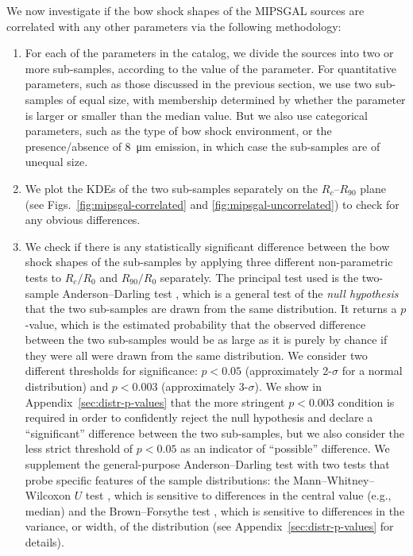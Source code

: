 We now investigate if the bow shock shapes of the MIPSGAL sources are
correlated with any other parameters via the following methodology:
\begin{enumerate}[1.]
\item For each of the parameters in the \citet{Kobulnicky:2016a}
  catalog, we divide the sources into two or more sub-samples,
  according to the value of the parameter.  For quantitative
  parameters, such as those discussed in the previous section, we use
  two sub-samples of equal size, with membership determined by whether
  the parameter is larger or smaller than the median value.  But we
  also use categorical parameters, such as the type of bow shock
  environment, or the presence/absence of \SI{8}{\um} emission, in
  which case the sub-samples are of unequal size.
\item We plot the KDEs of the two sub-samples separately on the
  \(R_c\)--\(R_{90}\) plane (see Figs.~\ref{fig:mipsgal-correlated} and
  \ref{fig:mipsgal-uncorrelated}) to check for any obvious
  differences.
\item We check if there is any statistically significant difference
  between the bow shock shapes of the sub-samples by applying three
  different non-parametric tests to \(R_c/R_0\) and \(R_{90}/R_0\)
  separately.  The principal test used is the two-sample
  Anderson--Darling test \citep{Anderson:1952a, Scholz:1987a,
    Makarov:2017a}, which is a general test of the \textit{null
    hypothesis} that the two sub-samples are drawn from the same
  distribution.  It returns a \(p\)-value, which is the estimated
  probability that the observed difference between the two sub-samples
  would be as large as it is purely by chance if they were all were
  drawn from the same distribution.  We consider two different
  thresholds for significance: \(p < 0.05\) (approximately
  2-\(\sigma\) for a normal distribution) and \(p < 0.003\) (approximately
  3-\(\sigma\)).  We show in Appendix~\ref{sec:distr-p-values} that the
  more stringent \(p < 0.003\) condition is required in order to
  confidently reject the null hypothesis and declare a ``significant''
  difference between the two sub-samples, but we also consider the
  less strict threshold of \(p < 0.05\) as an indicator of
  ``possible'' difference.  We supplement the general-purpose
  Anderson--Darling test with two tests that probe specific features of
  the sample distributions: the Mann--Whitney--Wilcoxon \(U\) test
  \citep{Mann:1947a}, which is sensitive to differences in the central
  value (e.g., median) and the Brown--Forsythe test
  \citep{Brown:1974a}, which is sensitive to differences in the
  variance, or width, of the distribution (see
  Appendix~\ref{sec:distr-p-values} for details).
\end{enumerate}

